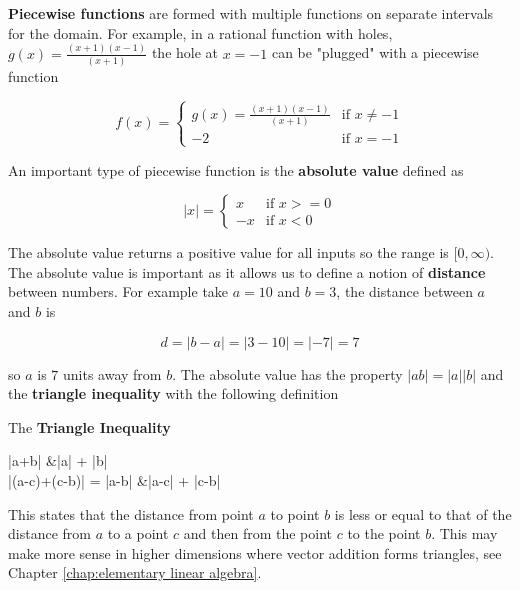 \textbf{Piecewise functions} are formed with multiple functions on separate intervals for the domain.
For example, in a rational function with holes, $g(x) = \frac{(x+1)(x-1)}{(x+1)}$ the hole at $x = -1$ can be "plugged" with a piecewise function

$$
f(x) =
\begin{cases}
    g(x) = \frac{(x+1)(x-1)}{(x+1)} & \text{if } x \neq -1 \\
    -2 & \text{if } x = -1
\end{cases}
$$

An important type of piecewise function is the \textbf{absolute value} defined as

\begin{equation}\label{eqn:absolute value}
    |x| =
    \begin{cases}
        x & \text{if } x >= 0 \\
        -x & \text{if } x < 0
    \end{cases}
\end{equation}

\noindent The absolute value returns a positive value for all inputs so the range is $[0,\infty)$. The absolute value is important as it allows us to define a notion of \textbf{distance} between numbers. For example take $a = 10$ and $b = 3$, the distance between $a$ and $b$ is

$$
d = |b - a| = |3 - 10| = |-7| = 7
$$

\noindent so $a$ is $7$ units away from $b$. The absolute value has the property $|ab| = |a||b|$ and the \textbf{triangle inequality} with the following definition

\begin{definition}\label{def:triangle inequality}
    The \textbf{Triangle Inequality}

    \begin{aequation}
        |a+b| &\leq |a| + |b| \\
        |(a-c)+(c-b)| = |a-b| &\leq |a-c| + |c-b|
    \end{aequation}
\end{definition}

\noindent This states that the distance from point $a$ to point $b$ is less or equal to that of the distance from $a$ to a point $c$ and then from the point $c$ to the point $b$. This may make more sense in higher dimensions where vector addition forms triangles, see Chapter \ref{chap:elementary linear algebra}.

